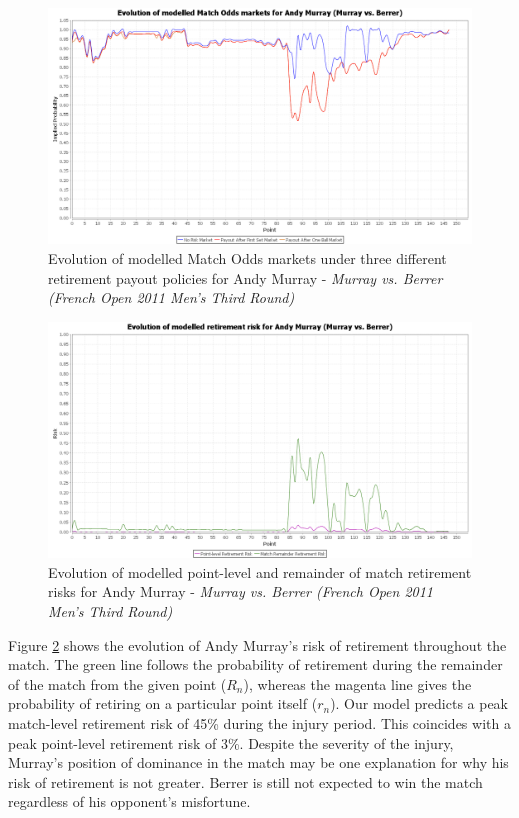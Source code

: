 \documentclass[letterpaper,12pt]{article}
\begin{document}
\begin{figure}[H]
  \centering \includegraphics[width=12.3cm]{matches/murrayberrermodel}
  \caption{Evolution of modelled Match Odds markets under three different retirement payout policies for Andy Murray - \textit{Murray vs. Berrer (French Open 2011 Men's Third Round)}}
  \label{murrayberrermodel}
\end{figure}

\begin{figure}[H]
  \centering \includegraphics[width=12.3cm]{matches/murrayberrerrisk}
  \caption{Evolution of modelled point-level and remainder of match retirement risks for Andy Murray - \textit{Murray vs. Berrer (French Open 2011 Men's Third Round)}}
  \label{murrayberrerrisk}
\end{figure}

Figure \ref{murrayberrerrisk} shows the evolution of Andy Murray's risk of retirement throughout the match.  The green line follows the probability of retirement during the remainder of the match from the given point ($R_n$), whereas the magenta line gives the probability of retiring on a particular point itself ($r_n$).  Our model predicts a peak match-level retirement risk of 45\% during the injury period.  This coincides with a peak point-level retirement risk of 3\%.  Despite the severity of the injury, Murray's position of dominance in the match may be one explanation for why his risk of retirement is not greater. Berrer is still not expected to win the match regardless of his opponent's misfortune.
\end{document}

